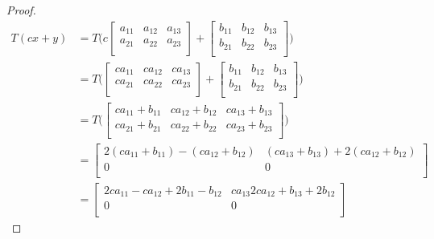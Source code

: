 \documentclass[12pt]{article}
\newenvironment{exercise}[2][Exercise]{\begin{trivlist}
\item[\hskip \labelsep{\bfseries #1}\hskip \labelsep{\bfseries #2.}]}{\end{trivlist}}
\begin{document}
\begin{exercise}{2.1.4}
\begin{proof}
        \begin{align*}
            T (cx + y) 
            & = T\big(
                c\begin{bmatrix}
                    a_{11} & a_{12} & a_{13} \\
                    a_{21} & a_{22} & a_{23} \\
                \end{bmatrix} + 
                \begin{bmatrix}
                    b_{11} & b_{12} & b_{13} \\
                    b_{21} & b_{22} & b_{23} \\
                \end{bmatrix}\big) \\
            & = T\big(
                \begin{bmatrix}
                    ca_{11} & ca_{12} & ca_{13} \\
                    ca_{21} & ca_{22} & ca_{23} \\
                \end{bmatrix} + 
                \begin{bmatrix}
                    b_{11} & b_{12} & b_{13} \\
                    b_{21} & b_{22} & b_{23} \\
                \end{bmatrix}\big) \\
            & = T\big(
                \begin{bmatrix}
                    ca_{11} + b_{11} & ca_{12} + b_{12} & ca_{13} + b_{13} \\
                    ca_{21} + b_{21} & ca_{22} + b_{22} & ca_{23} + b_{23} \\
                \end{bmatrix}\big) \\
            & = \begin{bmatrix}
                    2(ca_{11} + b_{11}) - (ca_{12} + b_{12}) & (ca_{13} + b_{13}) + 2(ca_{12} + b_{12}) \\
                    0 & 0 \\
                \end{bmatrix} \\
            & = \begin{bmatrix}
                    2ca_{11} - ca_{12} + 2b_{11} - b_{12} & ca_{13} 2ca_{12} + b_{13} + 2b_{12} \\
                    0 & 0 \\

\end{bmatrix}
\end{align*}
\end{proof}
\end{exercise}
\end{document}
